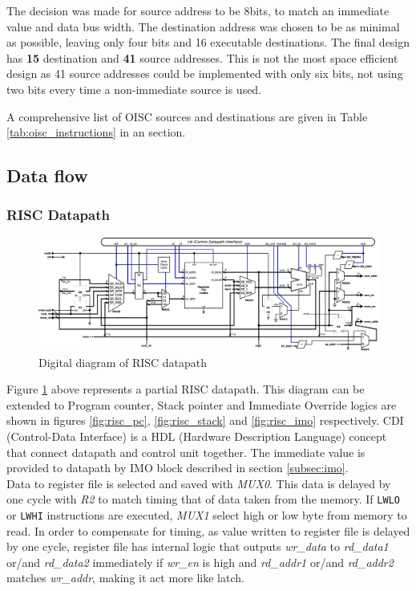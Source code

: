 The decision was made for source address to be 8bits, to match an immediate value and data bus width. The destination address was chosen to be as minimal as possible, leaving only four bits and 16 executable destinations. The final design has \textbf{15} destination and \textbf{41} source addresses. This is not the most space efficient design as 41 source addresses could be implemented with only six bits, not using two bits every time a non-immediate source is used.

A comprehensive list of OISC sources and destinations are given in Table \ref{tab:oisc_instructions} in an  section.

\begin{landscape}
	\subsection{Data flow} \label{sec:dataflow}
	\subsubsection{RISC Datapath} \label{subsec:datapath}
	\begin{figure}[h!]
		\centering
		\includegraphics[width=\linewidth]{../resources/datapath.eps}
		\caption{Digital diagram of RISC datapath}
		\label{fig:datapath}	
	\end{figure}
	
	Figure \ref{fig:datapath} above represents a partial RISC datapath. This diagram can be extended to Program counter, Stack pointer and Immediate Override logics are shown in figures \ref{fig:risc_pc}, \ref{fig:risc_stack} and \ref{fig:risc_imo} respectively. CDI (Control-Data Interface) is a HDL (Hardware Description Language) concept that connect datapath and control unit together. The immediate value is provided to datapath by IMO block described in section \ref{subsec:imo}.\\
	Data to register file is selected and saved with \textit{MUX0}. This data is delayed by one cycle with \textit{R2} to match timing that of data taken from the memory. If \texttt{LWLO} or \texttt{LWHI} instructions are executed, \textit{MUX1} select high or low byte from memory to read. In order to compensate for timing, as value written to register file is delayed by one cycle, register file has internal logic that outputs \textit{wr\_data} to \textit{rd\_data1} or/and  \textit{rd\_data2} immediately if \textit{wr\_en} is high and \textit{rd\_addr1} or/and \textit{rd\_addr2} matches \textit{wr\_addr}, making it act more like latch. \\
\end{landscape}
